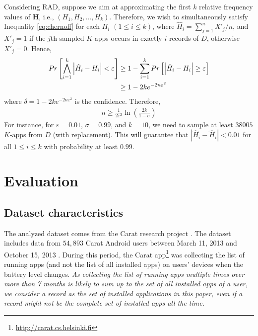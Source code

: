 \documentclass{acm_proc_article-sp}
\theoremstyle{plain}
\theoremstyle{plain}
\theoremstyle{plain}
\theoremstyle{plain}
\theoremstyle{plain}
\theoremstyle{plain}
\begin{document}
Considering RAD, suppose we aim at approximating the first $k$ relative frequency values of $\mathbf{H}$, i.e., $(H_1, H_2, \ldots, H_k)$. Therefore, we wish to simultaneously satisfy Inequality \ref{eq:chernoff} for each $H_i$ $(1\leq i \leq k)$, where  $\hat{H}_i = \sum_{j=1}^{n} X'_j/ n $, and $X'_j=1$ if the $j$th sampled $K$-apps occurs in exactly $i$ records of $D$, otherwise $X'_j=0$. Hence,
\begin{align}
Pr\left[ \bigwedge_{i=1}^k \left|\hat{H}_i  - H_i\right|< \varepsilon\right] 	 &\geq 1 -  \sum_{i=1}^k Pr\left[\left|\hat{H}_i  - H_i\right|\geq \varepsilon\right] \notag \\	
&\geq  1 - 2ke^{-2n\varepsilon^2} \notag \end{align}
where $\delta =  1 - 2ke^{-2n\varepsilon^2}$ is the confidence. Therefore, 
\begin{align}
\label{eq:rad_sample_size}
n \geq \frac{1}{2\varepsilon^2} \ln\left(\frac{2k}{1-\sigma}\right)
\end{align}
For instance, for $\varepsilon = 0.01$, $\sigma = 0.99$, and $k=10$, we need to sample at least $38005$ $K$-apps from $D$ (with replacement). This will guarantee that $|\hat{H}_i -\hat{H}_i| < 0.01$ for all $1 \leq i \leq k$ with probability at least $0.99$.
































\section{Evaluation}

\subsection{Dataset characteristics}
\label{sec:dataset}
The analyzed dataset comes from the Carat research project \cite{Oliner:2013}.
The dataset includes data from $54,893$ Carat Android users between March 11, 2013 and October 15, 2013  \cite{Truong:2014}.
During this period, the Carat app\footnote{\url{http://carat.cs.helsinki.fi}} was collecting the list of running apps (and not the list of all installed apps) on users' devices when the battery level changes.
\emph{As collecting the list of running apps multiple times over more than 7 months is likely to sum up to the set of all installed apps of a user, we consider a record as the set of installed applications in this paper, even if a record might not be the complete set of installed apps all the time.}
\end{document}
